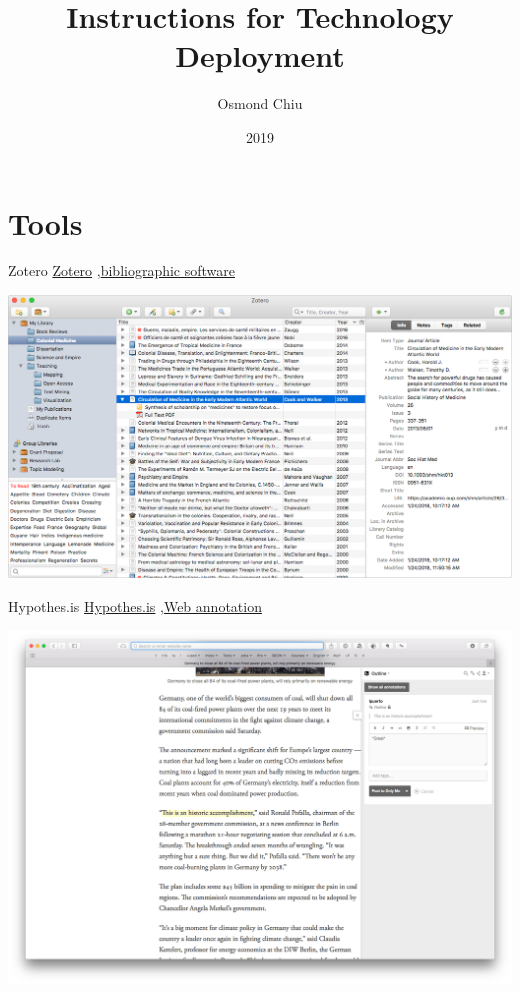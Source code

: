 \documentclass[10pt,a4paper]{article}
\title{Instructions for Technology Deployment}
\author{Osmond Chiu}
\date{2019}
\begin{document}
\small

\maketitle
\thispagestyle{empty}
\scriptsize
\tableofcontents





\section{Tools}


\begin{textbox}{Zotero}
 \href{https://zotero.org}{Zotero} \sep \href{https://zotero.org}{bibliographic software}

\includegraphics[width=\textwidth]{zotero.png}
\end{textbox}

\begin{textbox}{Hypothes.is}
 \href{https://hypothes.is/}{Hypothes.is} \sep \href{https://hypothes.is/}{Web annotation}

\includegraphics[width=\textwidth]{Hypothesis.png}

\end{textbox}
\end{document}
